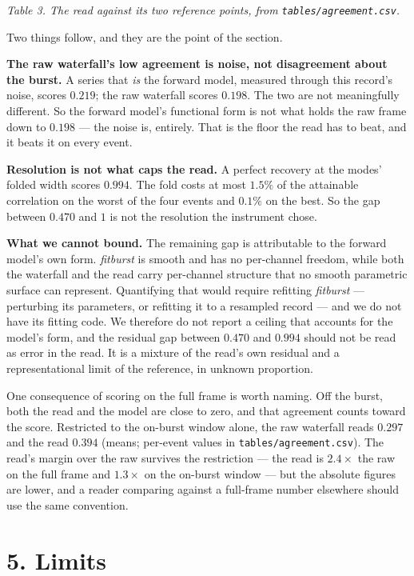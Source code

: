 \documentclass[10pt,letterpaper,twocolumn]{article}
\begin{document}
\emph{Table 3. The read against its two reference points, from \texttt{tables/\allowbreak{}agreement.\allowbreak{}csv}.}

Two things follow, and they are the point of the section.

\textbf{The raw waterfall's low agreement is noise, not disagreement about the burst.} A series that \emph{is} the forward model, measured through this record's noise, scores \(0.219\); the raw waterfall scores \(0.198\). The two are not meaningfully different. So the forward model's functional form is not what holds the raw frame down to \(0.198\) --- the noise is, entirely. That is the floor the read has to beat, and it beats it on every event.

\textbf{Resolution is not what caps the read.} A perfect recovery at the modes' folded width scores \(0.994\). The fold costs at most \(1.5\%\) of the attainable correlation on the worst of the four events and \(0.1\%\) on the best. So the gap between \(0.470\) and \(1\) is not the resolution the instrument chose.

\textbf{What we cannot bound.} The remaining gap is attributable to the forward model's own form. \emph{fitburst} is smooth and has no per-channel freedom, while both the waterfall and the read carry per-channel structure that no smooth parametric surface can represent. Quantifying that would require refitting \emph{fitburst} --- perturbing its parameters, or refitting it to a resampled record --- and we do not have its fitting code. We therefore do not report a ceiling that accounts for the model's form, and the residual gap between \(0.470\) and \(0.994\) should not be read as error in the read. It is a mixture of the read's own residual and a representational limit of the reference, in unknown proportion.

One consequence of scoring on the full frame is worth naming. Off the burst, both the read and the model are close to zero, and that agreement counts toward the score. Restricted to the on-burst window alone, the raw waterfall reads \(0.297\) and the read \(0.394\) (means; per-event values in \texttt{tables/\allowbreak{}agreement.\allowbreak{}csv}). The read's margin over the raw survives the restriction --- the read is \(2.4\times\) the raw on the full frame and \(1.3\times\) on the on-burst window --- but the absolute figures are lower, and a reader comparing against a full-frame number elsewhere should use the same convention.

\section{5. Limits}\label{5-limits}
\end{document}

